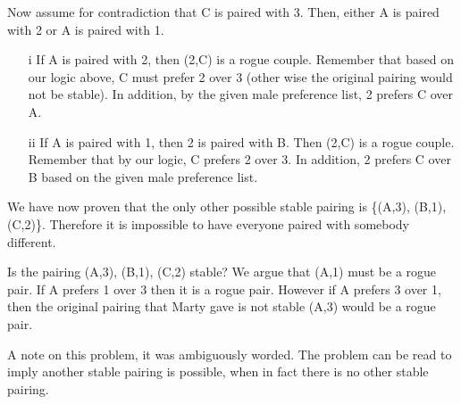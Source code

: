 \documentclass[11pt]{article}
\begin{document}
\begin{qunlist}
\begin{itemize}
{Now assume for contradiction that C is paired with 3. 
Then, either A is paired with 2 or A is paired with 1. \begin{itemize}
\item[i]If A is paired with 2, then (2,C) is a rogue couple. Remember that based on our logic above, C must prefer 2 over 3 (other wise the original pairing would not be stable). In addition, by the given male preference list, 2 prefers C over A.
\item[ii]If A is paired with 1, then 2 is paired with B.  Then (2,C) is a rogue couple. Remember that by our logic, C prefers 2 over 3. In addition, 2 prefers C over B based on the given male preference list. \end{itemize}


We have now proven that the only other possible stable pairing is 
\{(A,3), (B,1), (C,2)\}.
Therefore it is impossible to have everyone paired with somebody different.

Is the pairing {(A,3), (B,1), (C,2)} stable? We argue that (A,1) must be a rogue pair. If A prefers 1 over 3 then it is a rogue pair. However if A prefers 3 over 1, then the original pairing that Marty gave is not stable (A,3) would be a rogue pair.

A note on this problem, it was ambiguously worded. The problem can be read to imply another stable pairing is possible, when in fact there is no other stable pairing.

}
\fi



 

\end{itemize}
\end{qunlist}
\end{document}
